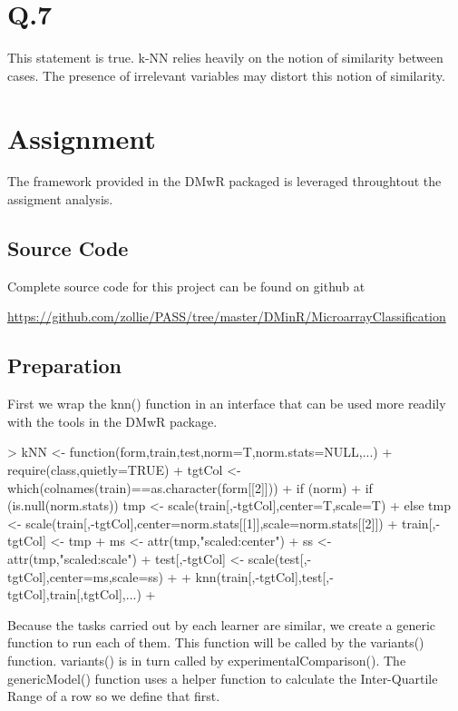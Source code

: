 \documentclass{article}
\begin{document}
\section*{Q.7}
This statement is true. k-NN relies heavily on the notion of similarity between cases. The presence of irrelevant variables may distort this notion of similarity. 

\section*{Assignment}
The framework provided in the DMwR packaged is leveraged throughtout the assigment analysis. 

\subsection*{Source Code}
Complete source code for this project can be found on github at 

\url{https://github.com/zollie/PASS/tree/master/DMinR/MicroarrayClassification}

\subsection*{Preparation}
First we wrap the knn() function in an interface that can be used more readily with the tools in the DMwR package. 

\begin{Schunk}
\begin{Sinput}
> kNN <- function(form,train,test,norm=T,norm.stats=NULL,...) {
+   require(class,quietly=TRUE)
+   tgtCol <- which(colnames(train)==as.character(form[[2]]))
+   if (norm) {
+     if (is.null(norm.stats)) tmp <- scale(train[,-tgtCol],center=T,scale=T)
+     else tmp <- scale(train[,-tgtCol],center=norm.stats[[1]],scale=norm.stats[[2]])
+     train[,-tgtCol] <- tmp
+     ms <- attr(tmp,"scaled:center")
+     ss <- attr(tmp,"scaled:scale")
+     test[,-tgtCol] <- scale(test[,-tgtCol],center=ms,scale=ss)
+   }
+   knn(train[,-tgtCol],test[,-tgtCol],train[,tgtCol],...)
+ }
\end{Sinput}
\end{Schunk}

Because the tasks carried out by each learner are similar, we create a generic function to run each of them. This function will be called by the variants() function. variants() is in turn called by experimentalComparison(). The genericModel() function uses a helper function to calculate the Inter-Quartile Range of a row so we define that first. 
\end{document}
